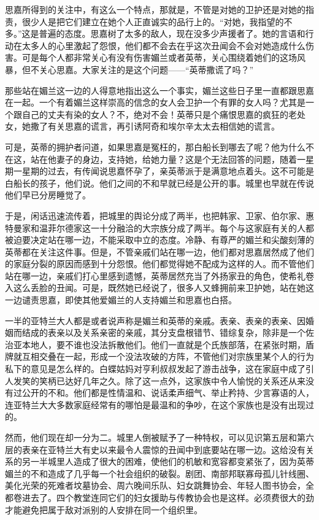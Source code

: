 \par 思嘉所得到的关注中，有这么一个特点，那就是，不管是对她的卫护还是对她的指责，很少人是把它们建立在她个人正直诚实的品行上的。“对她，我指望的不多。”这是普遍的态度。思嘉树了太多的敌人，现在没多少声援者了。她的言语和行动在太多人的心里激起了怨恨，他们都不会去在乎这次丑闻会不会对她造成什么伤害。可是每个人都非常关心有没有伤害媚兰或者英蒂，关心围绕着她们的这场风暴，但不关心思嘉。大家关注的是这个问题——“英蒂撒谎了吗？”
\par 那些站在媚兰这一边的人得意地指出这么一个事实，媚兰这些日子里一直都跟思嘉在一起。一个有着媚兰这样崇高的信念的女人会卫护一个有罪的女人吗？尤其是一个跟自己的丈夫有染的女人？不，绝对不会！英蒂只是个痛恨思嘉的疯狂的老处女，她撒了有关思嘉的谎言，再引诱阿奇和埃尔辛太太去相信她的谎言。
\par 可是，英蒂的拥护者问道，如果思嘉是冤枉的，那白船长到哪去了呢？他为什么不在这，站在他妻子的身边，支持她，给她力量？这是个无法回答的问题，随着一星期一星期的过去，有传闻说思嘉怀孕了，亲英蒂派于是满意地点着头。这不可能是白船长的孩子，他们说。他们之间的不和早就已经是公开的事。城里也早就在传说他们早已分房睡觉了。
\par 于是，闲话迅速流传着，把城里的舆论分成了两半，也把韩家、卫家、伯尔家、惠特曼家和温菲尔德家这一十分融洽的大宗族分成了两半。每个与这家庭有关的人都被迫要决定站在哪一边，不能采取中立的态度。冷静、有尊严的媚兰和尖酸刻薄的英蒂都在关注这件事。但是，不管亲戚们站在哪一边，他们都对思嘉居然成了他们的家庭分裂的原因而感到十分怨恨。他们都觉得她不配成为这样的人。而不管他们站在哪一边，亲戚们打心里感到遗憾，英蒂居然充当了外扬家丑的角色，使希礼卷入这么丢脸的丑闻。可是，既然她已经说了，很多人又蜂拥前来卫护她，站在她这一边谴责思嘉，即使其他爱媚兰的人支持媚兰和思嘉也白搭。
\par 一半的亚特兰大人都是或者说声称是媚兰和英蒂的亲戚。表亲、表亲的表亲、因婚姻而结成的表亲以及关系亲密的亲戚，其分支盘根错节、错综复杂，除非是一个佐治亚本地人，要不谁也没法拆散他们。他们一直就是个氏族部落，在紧张时期，盾牌就互相交叠在一起，形成一个没法攻破的方阵，不管他们对宗族里某个人的行为私下的意见是怎么样的。白蝶姑妈对亨利叔叔发起了游击战争，这在家庭中成了引人发笑的笑柄已达好几年之久。除了这一点外，这家族中令人愉悦的关系还从来没有过公开的不和。他们都是性情温和、说话柔声细气、举止矜持、少言寡语的人，连亚特兰大大多数家庭经常有的哪怕是最温和的争吵，在这个家族也是没有出现过的。
\par 然而，他们现在却一分为二。城里人倒被赋予了一种特权，可以见识第五层和第六层的表亲在亚特兰大有史以来最令人震惊的丑闻中到底要站在哪一边。这给没有关系的另一半城里人造成了很大的困难，使他们的机敏和宽容都变紧张了，因为英蒂媚兰的不和造成了几乎每一个社会组织的破裂。剧团、南部邦联寡母孤儿针线圈、美化光荣的死难者坟墓协会、周六晚间乐队、妇女跳舞协会、年轻人图书协会，全都卷进去了。四个教堂连同它们的妇女援助与传教协会也是这样。必须费很大的劲才能避免把属于敌对派别的人安排在同一个组织里。
